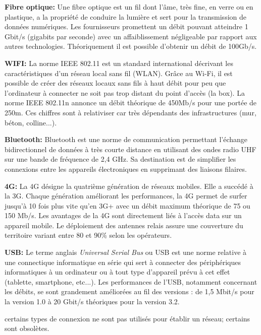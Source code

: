 \documentclass[a4paper,11pt]{article}
\begin{document}
\begin{Form}
\begin{framed}
\end{framed}
\begin{framed}
\textbf{Fibre optique:} Une fibre optique est un fil dont l’âme, très fine, en verre ou en plastique, a la propriété de conduire la lumière et sert pour la transmission de données numériques. Les fournisseurs promettent un débit pouvant atteindre 1 Gbit/s (gigabits par seconde) avec un affaiblissement négligeable par rapport aux autres technologies. Théoriquement il est possible d'obtenir un débit de 100Gb/s.
\end{framed}
\begin{framed}
\textbf{WIFI:} La norme IEEE 802.11 est un standard international décrivant les caractéristiques d'un réseau local sans fil (WLAN). Grâce au Wi-Fi, il est possible de créer des réseaux locaux sans fils à haut débit pour peu que l'ordinateur à connecter ne soit pas trop distant du point d'accès (la box). La norme IEEE 802.11n annonce un débit théorique de 450Mb/s pour une portée de 250m. Ces chiffres sont à relativiser car très dépendants des infrastructures (mur, béton, colline...).
\end{framed}
\begin{framed}
\textbf{Bluetooth:} Bluetooth est une norme de communication permettant l'échange bidirectionnel de données à très courte distance en utilisant des ondes radio UHF sur une bande de fréquence de 2,4 GHz. Sa destination est de simplifier les connexions entre les appareils électroniques en supprimant des liaisons filaires.
\end{framed}
\begin{framed}
\textbf{4G:} La 4G désigne la quatrième génération de réseaux mobiles. Elle a succédé à la 3G. Chaque génération améliorant les performances, la 4G permet de surfer jusqu'à 10 fois plus vite qu’en 3G+ avec un débit maximum théorique de 75 ou 150 Mb/s. Les avantages de la 4G sont directement liés à l'accès data sur un appareil mobile. Le déploiement des antennes relais assure une couverture du territoire variant entre 80 et 90\% selon les opérateurs.
\end{framed}
\begin{framed}
\textbf{USB:} Le terme anglais \emph{Universal Serial Bus} ou USB est une norme relative à une connectique informatique en série qui sert à connecter des périphériques informatiques à un ordinateur ou à tout type d'appareil prévu à cet effet (tablette, smartphone, etc...). Les performances de l'USB, notamment concernant les débits, se sont grandement améliorées au fil des versions : de 1,5 Mbit/s pour la version 1.0 à 20 Gbit/s théoriques pour la version 3.2.
\end{framed}
\begin{commentprof}
certains types de connexion ne sont pas utilisés pour établir un réseau; certains sont obsolètes.
\end{commentprof}

\end{Form}
\end{document}
